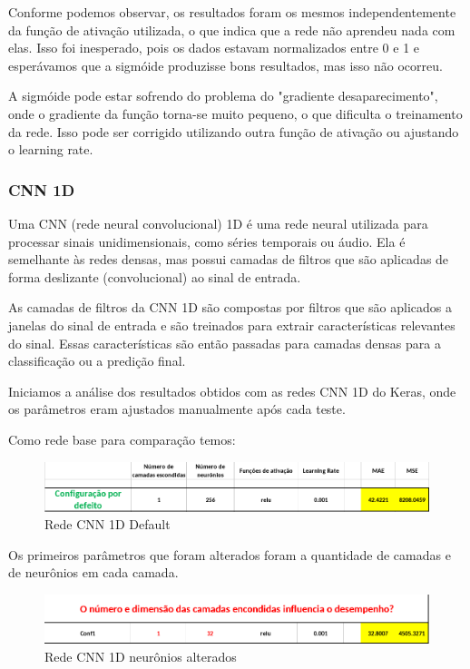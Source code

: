 \documentclass[10pt]{article}
\begin{document}
Conforme podemos observar, os resultados foram os mesmos independentemente 
da função de ativação utilizada, o que indica que a rede não aprendeu nada 
com elas. Isso foi inesperado, pois os dados estavam normalizados entre 0 e 1 
e esperávamos que a sigmóide produzisse bons resultados, mas isso não ocorreu.

A sigmóide pode estar sofrendo do problema do "gradiente desaparecimento", 
onde o gradiente da função torna-se muito pequeno, o que dificulta o 
treinamento da rede. Isso pode ser corrigido utilizando outra função de 
ativação ou ajustando o learning rate.

\subsubsection{CNN 1D}
Uma CNN (rede neural convolucional) 1D é uma rede neural utilizada 
para processar sinais unidimensionais, como séries temporais ou áudio. Ela 
é semelhante às redes densas, mas possui camadas de filtros que são aplicadas 
de forma deslizante (convolucional) ao sinal de entrada.

As camadas de filtros da CNN 1D são compostas por filtros que são aplicados a 
janelas do sinal de entrada e são treinados para extrair características 
relevantes do sinal. Essas características são então passadas para camadas 
densas para a classificação ou a predição final.

Iniciamos a análise dos resultados obtidos com as redes CNN 1D do Keras, 
onde os parâmetros eram ajustados manualmente após cada teste.

Como rede base para comparação temos:

\begin{figure}[htb]
  \centering
  \includegraphics[width=\linewidth]{img/cnn_default.png}
  \caption{Rede CNN 1D Default}
  \label{fig:cnn_default}
\end{figure}

\vspace{1cm}
Os primeiros parâmetros que foram alterados foram a quantidade de 
camadas e de neurônios em cada camada.

\begin{figure}[htb]
  \centering
  \includegraphics[width=\linewidth]{img/cnn_neuronios.png}
  \caption{Rede CNN 1D neurônios alterados}
  \label{fig:cnn_neuronios}
\end{figure}
\end{document}
